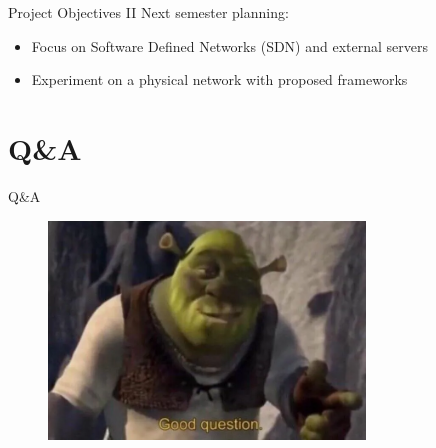 \documentclass{beamer}
\begin{document}
\begin{frame}{Project Objectives II}
Next semester planning:
\begin{itemize}
    \item Focus on Software Defined Networks (SDN) and external servers
    \item Experiment on a physical network with proposed frameworks
\end{itemize}
\end{frame}

\section{Q&A}

\begin{frame}{Q&A}
  \begin{figure}
    \centering
    \includegraphics[width=0.75\textwidth]{img/shrek.png}
  \end{figure}
\end{frame}

\end{document}
